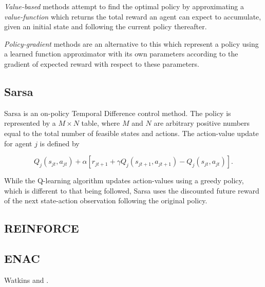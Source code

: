 \textit{Value-based} methods attempt to find the optimal policy by
approximating a \textit{value-function} which returns the total reward an
agent can expect to accumulate, given an initial state and following the
current policy thereafter.

\textit{Policy-gradient} methods are an alternative to this which
represent a policy using a learned function approximator with its own
parameters %
according to the gradient of expected reward with respect to these parameters.

\subsection{Sarsa}
Sarsa is an on-policy Temporal Difference control method.  The
policy is represented by a $M \times N$ table, where $M$ and $N$ are
arbitrary positive numbers equal to the total number of feasible states and
actions. The action-value update for agent $j$ is defined by

\begin{equation}
Q_j(s_{jt},a_{jt}) + \alpha [r_{jt+1} + \gamma Q_j(s_{jt+1},a_{jt+1}) -
Q_j(s_{jt},a_{jt})].
\end{equation}

While the Q-learning algorithm updates action-values using a greedy policy,
which is different to that being followed, Sarsa uses the discounted future
reward of the next state-action observation following the original policy.

\subsection{REINFORCE}
\label{sec:reinforce}

\subsection{ENAC}
\label{sec:enac}
Watkins \cite{dommel:opf} and \cite{zimmerman:ccv}.
